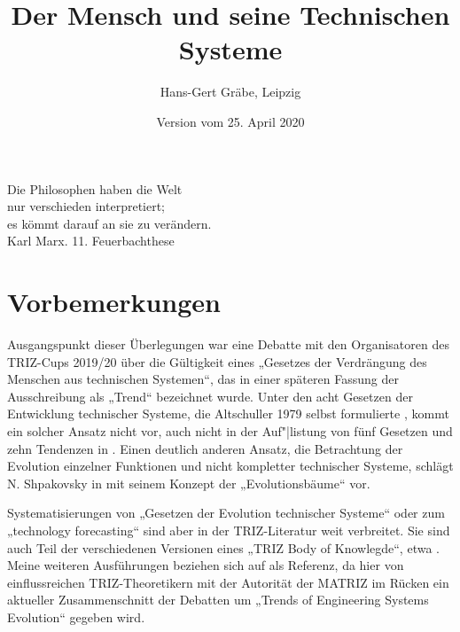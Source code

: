 \documentclass[11pt,a4paper]{article}
\title{Der Mensch und seine Technischen Systeme}
\author{Hans-Gert Gräbe, Leipzig}
\date{Version vom 25. April 2020}
\begin{document}
\maketitle

\begin{flushright}
  Die Philosophen haben die Welt\\ nur verschieden interpretiert;\\ es kömmt
  darauf an sie zu verändern.\\ Karl Marx. 11. Feuerbachthese
\end{flushright}
\section{Vorbemerkungen}

Ausgangspunkt dieser Überlegungen war eine Debatte mit den Organisatoren des
TRIZ-Cups 2019/20 über die Gültigkeit eines „Gesetzes der Verdrängung des
Menschen aus technischen Systemen“, das in einer späteren Fassung der
Ausschreibung als „Trend“ bezeichnet wurde. Unter den acht Gesetzen der
Entwicklung technischer Systeme, die Altschuller 1979 selbst formulierte
\cite[S. 2]{TESE2018}, kommt ein solcher Ansatz nicht vor, auch nicht in der
Auf"|listung von fünf Gesetzen und zehn Tendenzen in
\cite[S. 148\,ff.]{KS2017}.  Einen deutlich anderen Ansatz, die Betrachtung
der Evolution einzelner Funktionen und nicht kompletter technischer Systeme,
schlägt N. Shpakovsky in \cite{Shpakovsky2010} mit seinem Konzept der
„Evolutionsbäume“ vor.

Systematisierungen von „Gesetzen der Evolution technischer Systeme“ oder zum
„technology forecasting“ sind aber in der TRIZ-Literatur weit verbreitet. Sie
sind auch Teil der verschiedenen Versionen eines „TRIZ Body of Knowlegde“,
etwa \cite{TBK-2007}. Meine weiteren Ausführungen beziehen sich auf
\cite{TESE2018} als Referenz, da hier von einflussreichen TRIZ-Theoretikern
mit der Autorität der MATRIZ im Rücken ein aktueller Zusammenschnitt der
Debatten um „Trends of Engineering Systems Evolution“ gegeben wird.
\end{document}

